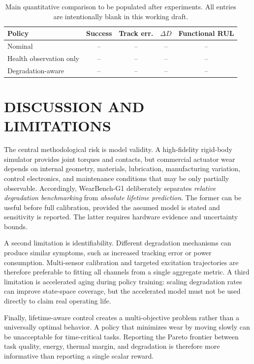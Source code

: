 \documentclass[letterpaper,10pt,conference]{ieeeconf}
\begin{document}
\begin{table}[t]
\caption{Main quantitative comparison to be populated after experiments. All entries are intentionally blank in this working draft.}
\label{tab:mainresults}
\centering
\scriptsize
\begin{tabular}{@{}lcccc@{}}
\toprule
Policy & Success & Track err. & $\Delta D$ & Functional RUL \\
\midrule
Nominal & -- & -- & -- & -- \\
Health observation only & -- & -- & -- & -- \\
Degradation-aware & -- & -- & -- & -- \\
\bottomrule
\end{tabular}
\end{table}

\section{DISCUSSION AND LIMITATIONS}

The central methodological risk is model validity. A high-fidelity rigid-body simulator provides joint torques and contacts, but commercial actuator wear depends on internal geometry, materials, lubrication, manufacturing variation, control electronics, and maintenance conditions that may be only partially observable. Accordingly, WearBench-G1 deliberately separates \emph{relative degradation benchmarking} from \emph{absolute lifetime prediction}. The former can be useful before full calibration, provided the assumed model is stated and sensitivity is reported. The latter requires hardware evidence and uncertainty bounds.

A second limitation is identifiability. Different degradation mechanisms can produce similar symptoms, such as increased tracking error or power consumption. Multi-sensor calibration and targeted excitation trajectories are therefore preferable to fitting all channels from a single aggregate metric. A third limitation is accelerated aging during policy training: scaling degradation rates can improve state-space coverage, but the accelerated model must not be used directly to claim real operating life.

Finally, lifetime-aware control creates a multi-objective problem rather than a universally optimal behavior. A policy that minimizes wear by moving slowly can be unacceptable for time-critical tasks. Reporting the Pareto frontier between task quality, energy, thermal margin, and degradation is therefore more informative than reporting a single scalar reward.
\end{document}
